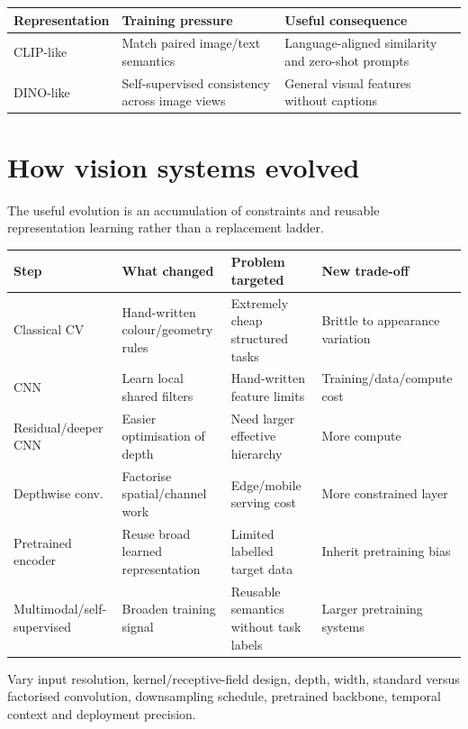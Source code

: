 \begin{center}
\small
\begin{tabularx}{.94\linewidth}{@{}L{.23\linewidth}YY@{}}
\toprule
\textbf{Representation} & \textbf{Training pressure} & \textbf{Useful consequence} \\
\midrule
CLIP-like & Match paired image/text semantics & Language-aligned similarity and zero-shot prompts \\
DINO-like & Self-supervised consistency across image views & General visual features without captions \\
\bottomrule
\end{tabularx}
\end{center}

\section{How vision systems evolved}
\label{sec:cnn-evolution}
The useful evolution is an accumulation of constraints and reusable representation learning rather than a replacement ladder.

\begin{center}
\small
\begin{tabularx}{.97\linewidth}{@{}L{.18\linewidth}L{.22\linewidth}YY@{}}
\toprule
\textbf{Step} & \textbf{What changed} & \textbf{Problem targeted} & \textbf{New trade-off} \\
\midrule
Classical CV & Hand-written colour/geometry rules & Extremely cheap structured tasks & Brittle to appearance variation \\
CNN & Learn local shared filters & Hand-written feature limits & Training/data/compute cost \\
Residual/deeper CNN & Easier optimisation of depth & Need larger effective hierarchy & More compute \\
Depthwise conv. & Factorise spatial/channel work & Edge/mobile serving cost & More constrained layer \\
Pretrained encoder & Reuse broad learned representation & Limited labelled target data & Inherit pretraining bias \\
Multimodal/self-supervised & Broaden training signal & Reusable semantics without task labels & Larger pretraining systems \\
\bottomrule
\end{tabularx}
\end{center}

\begin{calloutdegreeofexperiment}
Vary input resolution, kernel/receptive-field design, depth, width, standard versus factorised convolution, downsampling schedule, pretrained backbone, temporal context and deployment precision.
\end{calloutdegreeofexperiment}
